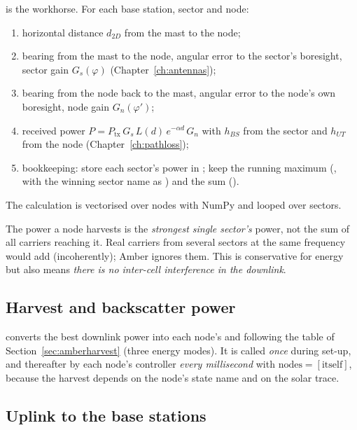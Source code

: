  is the workhorse. For each base station, sector and node:
\begin{enumerate}
 \item horizontal distance $d_{2D}$ from the mast to the node;
 \item bearing from the mast to the node, angular error to the sector's boresight, sector gain $G_s(\varphi)$ (Chapter~\ref{ch:antennas});
 \item bearing from the node back to the mast, angular error to the node's own boresight, node gain $G_n(\varphi')$;
 \item received power $P=P_{\mathrm{tx}}\,G_s\,L(d)\,e^{-\alpha d}\,G_n$ with $h_{BS}$ from the sector and $h_{UT}$ from the node (Chapter~\ref{ch:pathloss});
 \item bookkeeping: store each sector's power in ; keep the running maximum (, with the winning sector name as ) and the sum ().
\end{enumerate}
The calculation is vectorised over nodes with NumPy and looped over sectors.

\begin{keyidea}
The power a node harvests is the \emph{strongest single sector's} power, not the sum of all carriers reaching it. Real carriers from several sectors at the same frequency would add (incoherently); Amber ignores them. This is conservative for energy but also means \emph{there is no inter-cell interference in the downlink}.
\end{keyidea}

\subsection{Harvest and backscatter power}

 converts the best downlink power into each node's  and  following the table of Section~\ref{sec:amberharvest} (three energy modes). It is called \emph{once} during set-up, and thereafter by each node's controller \emph{every millisecond} with $\text{nodes}=[\text{itself}]$, because the harvest depends on the node's state name and on the solar trace.

\subsection{Uplink to the base stations}

